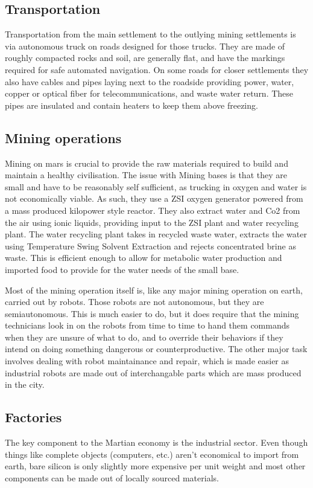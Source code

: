 \documentclass[10pt]{article}
\begin{document}
\subsection{Transportation}
Transportation from the main settlement to the outlying mining settlements is via autonomous truck on roads designed for those trucks. They are made of roughly compacted rocks and soil, are generally flat, and have the markings required for safe automated navigation. On some roads for closer settlements they also have cables and pipes laying next to the roadside providing power, water, copper or optical fiber for telecommunications, and waste water return. These pipes are insulated and contain heaters to keep them above freezing. 

\subsection{Mining operations}
Mining on mars is crucial to provide the raw materials required to build and maintain a healthy civilisation. The issue with Mining bases is that they are small and have to be reasonably self sufficient, as trucking in oxygen and water is not economically viable. As such, they use a ZSI oxygen generator powered from a mass produced kilopower style reactor. They also extract water and Co2 from the air using ionic liquids, providing input to the ZSI plant and water recycling plant. The water recycling plant takes in recycled waste water, extracts the water using Temperature Swing Solvent Extraction and rejects concentrated brine as waste. This is efficient enough to allow for metabolic water production and imported food to provide for the water needs of the small base.

Most of the mining operation itself is, like any major mining operation on earth, carried out by robots. Those robots are not autonomous, but they are semiautonomous. This is much easier to do, but it does require that the mining technicians look in on the robots from time to time to hand them commands when they are unsure of what to do, and to override their behaviors if they intend on doing something dangerous or counterproductive. The other major task involves dealing with robot maintainance and repair, which is made easier as industrial robots are made out of interchangable parts which are mass produced in the city. 

\subsection{Factories}
The key component to the Martian economy is the industrial sector. Even though things like complete objects (computers, etc.) aren't economical to import from earth, bare silicon is only slightly more expensive per unit weight and most other components can be made out of locally sourced materials. 
\end{document}
